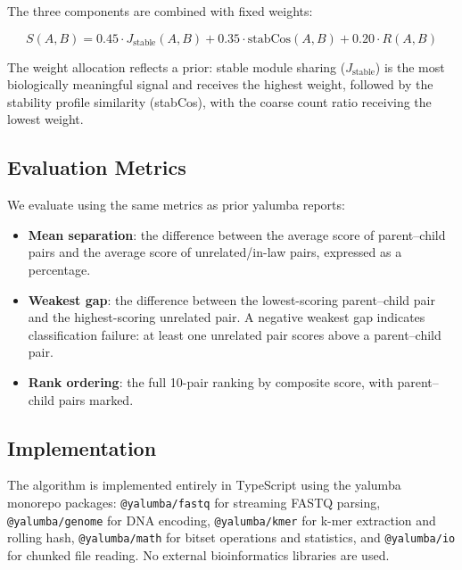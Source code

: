 \documentclass{../yalumba}
\begin{document}
The three components are combined with fixed weights:

\begin{equation}
  S(A, B) = 0.45 \cdot J_{\text{stable}}(A, B)
           + 0.35 \cdot \text{stabCos}(A, B)
           + 0.20 \cdot R(A, B)
  \label{eq:composite}
\end{equation}

The weight allocation reflects a prior: stable module sharing
($J_{\text{stable}}$) is the most biologically meaningful signal and receives
the highest weight, followed by the stability profile similarity
(stabCos), with the coarse count ratio receiving the lowest weight.

\subsection{Evaluation Metrics}

We evaluate using the same metrics as prior yalumba reports:

\begin{itemize}
  \item \textbf{Mean separation}: the difference between the average score
    of parent--child pairs and the average score of unrelated/in-law pairs,
    expressed as a percentage.
  \item \textbf{Weakest gap}: the difference between the lowest-scoring
    parent--child pair and the highest-scoring unrelated pair.  A negative
    weakest gap indicates classification failure: at least one unrelated pair
    scores above a parent--child pair.
  \item \textbf{Rank ordering}: the full 10-pair ranking by composite score,
    with parent--child pairs marked.
\end{itemize}

\subsection{Implementation}

The algorithm is implemented entirely in TypeScript using the yalumba monorepo
packages: \texttt{@yalumba/fastq} for streaming FASTQ parsing,
\texttt{@yalumba/genome} for DNA encoding, \texttt{@yalumba/kmer} for k-mer
extraction and rolling hash, \texttt{@yalumba/math} for bitset operations and
statistics, and \texttt{@yalumba/io} for chunked file reading.  No external
bioinformatics libraries are used.

\end{document}
